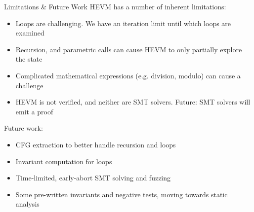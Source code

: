 \documentclass[aspectratio=169]{beamer}
\begin{document}
\begin{frame}[fragile=singleslide]{Limitations \& Future Work}
HEVM has a number of inherent limitations:

\begin{itemize}
\item Loops are challenging. We have an iteration limit until which loops are examined
\item Recursion, and parametric calls can cause HEVM to only partially explore the state
\item Complicated mathematical expressions (e.g. division, modulo) can cause a challenge
\item HEVM is not verified, and neither are SMT solvers. Future: SMT solvers will emit a proof
\end{itemize}
\vspace{2ex}

Future work:
\begin{itemize}
\item CFG extraction to better handle recursion and loops
\item Invariant computation for loops
\item Time-limited, early-abort SMT solving and fuzzing
\item Some pre-written invariants and negative tests, moving towards static analysis
\end{itemize}
\end{frame}

%
%
%
%
\end{document}
